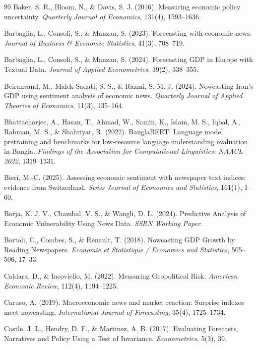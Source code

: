 \documentclass[11pt,twocolumn]{article}
\begin{document}
\begin{thebibliography}{99}
 Baker, S. R., Bloom, N., \& Davis, S. J. (2016). Measuring economic policy uncertainty. \textit{Quarterly Journal of Economics}, 131(4), 1593--1636.

 Barbaglia, L., Consoli, S., \& Manzan, S. (2023). Forecasting with economic news. \textit{Journal of Business \& Economic Statistics}, 41(3), 708--719.

 Barbaglia, L., Consoli, S., \& Manzan, S. (2024). Forecasting GDP in Europe with Textual Data. \textit{Journal of Applied Econometrics}, 39(2), 338--355.

 Beiranvand, M., Malek Sadati, S. S., \& Razmi, S. M. J. (2024). Nowcasting Iran's GDP using sentiment analysis of economic news. \textit{Quarterly Journal of Applied Theories of Economics}, 11(3), 135--164.

 Bhattacharjee, A., Hasan, T., Ahmad, W., Samin, K., Islam, M. S., Iqbal, A., Rahman, M. S., \& Shahriyar, R. (2022). BanglaBERT: Language model pretraining and benchmarks for low-resource language understanding evaluation in Bangla. \textit{Findings of the Association for Computational Linguistics: NAACL 2022}, 1319--1331.



 Bieri, M.-C. (2025). Assessing economic sentiment with newspaper text indices: evidence from Switzerland. \textit{Swiss Journal of Economics and Statistics}, 161(1), 1--60.

 Borja, K. J. V., Chambal, V. S., \& Wangli, D. L. (2024). Predictive Analysis of Economic Vulnerability Using News Data. \textit{SSRN Working Paper}.

 Bortoli, C., Combes, S., \& Renault, T. (2018). Nowcasting GDP Growth by Reading Newspapers. \textit{Economie et Statistique / Economics and Statistics}, 505--506, 17--33.

 Caldara, D., \& Iacoviello, M. (2022). Measuring Geopolitical Risk. \textit{American Economic Review}, 112(4), 1194--1225.

 Caruso, A. (2019). Macroeconomic news and market reaction: Surprise indexes meet nowcasting. \textit{International Journal of Forecasting}, 35(4), 1725--1734.

 Castle, J. L., Hendry, D. F., \& Martinez, A. B. (2017). Evaluating Forecasts, Narratives and Policy Using a Test of Invariance. \textit{Econometrics}, 5(3), 39.


\end{thebibliography}
\end{document}
